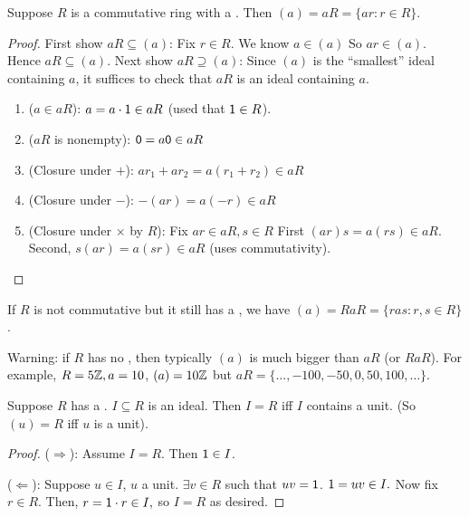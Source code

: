 \documentclass[notes.tex]{subfiles}
\begin{document}
\begin{proposition}
	Suppose $R$ is a commutative ring with a \one. Then $(a) = aR = \{ar : r\in R\}$.
\end{proposition}
\begin{proof}
	\tabin
		First show $aR \subseteq (a)$:
	\tabout
	Fix $r\in R$. We know $a\in (a)$ So $ar\in (a)$. Hence $aR \subseteq (a)$.
	\tabin
		Next show $aR\supseteq (a)$:
	\tabout
	Since $(a)$ is the ``smallest'' ideal containing $a$, it suffices to check that $aR$ is an ideal containing $a$.
	\begin{enumerate}
		\item ($a\in aR$): $a=a\cdot \mathsf{1} \in aR$ (used that $\mathsf{1} \in R$).
		\item ($aR$ is nonempty): $\mathsf{0} = a\mathsf{0} \in aR$
		\item (Closure under $+$): $ar_1 + ar_2 = a(r_1 + r_2) \in aR$
		\item (Closure under $-$): $-(ar) = a(-r) \in aR$
		\item (Closure under $\times$ by $R$): Fix $ar\in aR, s\in R$
		First $(ar)s = a(rs) \in aR$. Second, $s(ar) = a(sr) \in aR$ (uses commutativity).
	\end{enumerate}
\end{proof}
\begin{remark}
	If $R$ is not commutative but it still has a \one, we have $(a) = RaR = \{ras: r, s\in R\}$.
\end{remark}
\begin{remark}
	Warning: if $R$ has no \one, then typically $(a)$ is much bigger than $aR$ (or $RaR$).
	For example, $R = 5\mathbb{Z}, a=10$, $(a) = 10\mathbb{Z}$ but $aR = \{\ldots, -100, -50, 0, 50, 100, \ldots\}$.
\end{remark}

\begin{proposition}
	\label{prop:unitideal}
	Suppose $R$ has a \one. $I\subseteq R$ is an ideal. Then $I=R$ iff $I$ contains a unit.
	(So $(u) = R$ iff $u$ is a unit).
\end{proposition}
\begin{proof}
($\Longrightarrow$): Assume $I=R$. Then $\mathsf{1} \in I$.

($\Longleftarrow$): Suppose $u\in I$, $u$ a unit. $\exists v\in R$ such that $uv =\mathsf{1}$. $\mathsf{1} = uv \in I.$ Now fix $r\in R$. Then, $r = \mathsf{1}\cdot r\in I,$ so $I=R$ as desired.
\end{proof}
\end{document}
